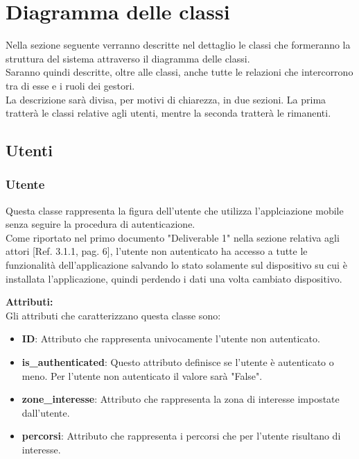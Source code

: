 \documentclass{article}
\begin{document}
\clearpage

\section{Diagramma delle classi}

Nella sezione seguente verranno descritte nel dettaglio le classi che formeranno la struttura del sistema attraverso il diagramma delle classi.\\
Saranno quindi descritte, oltre alle classi, anche tutte le relazioni che intercorrono tra di esse e i ruoli dei gestori.\\

La descrizione sarà divisa, per motivi di chiarezza, in due sezioni. La prima tratterà le classi relative agli utenti, mentre la seconda tratterà le rimanenti.\\

\subsection{Utenti}

\subsubsection{Utente}

Questa classe rappresenta la figura dell'utente che utilizza l'applciazione mobile senza seguire la procedura di autenticazione.\\
Come riportato nel primo documento "Deliverable 1" nella sezione relativa agli attori [Ref. 3.1.1, pag. 6], l'utente non autenticato ha accesso a tutte le funzionalità dell'applicazione salvando lo stato solamente sul dispositivo su cui è installata l'applicazione, quindi perdendo i dati una volta cambiato dispositivo.

\textbf{Attributi:}\\

Gli attributi che caratterizzano questa classe sono:
\begin{itemize}
    \item \textbf{ID}: Attributo che rappresenta univocamente l'utente non autenticato.
    \item \textbf{is\_authenticated}: Questo attributo definisce se l'utente è autenticato o meno. Per l'utente non autenticato il valore sarà "False".
    \item \textbf{zone\_interesse}: Attributo che rappresenta la zona di interesse impostate dall'utente.
    \item \textbf{percorsi}: Attributo che rappresenta i percorsi che per l'utente risultano di interesse.
\end{itemize}
 
\end{document}
